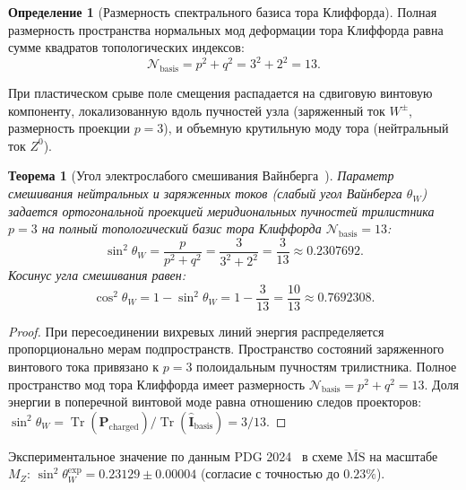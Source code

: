 \documentclass[11pt,a4paper]{article}
\newtheorem{theorem}{Теорема}
\theoremstyle{definition}
\newtheorem{definition}{Определение}
\theoremstyle{remark}
\begin{document}
\begin{definition}[Размерность спектрального базиса тора Клиффорда]
Полная размерность пространства нормальных мод деформации тора Клиффорда равна сумме квадратов топологических индексов:
\begin{equation}
\mathcal{N}_{\mathrm{basis}} = p^2 + q^2 = 3^2 + 2^2 = 13.
\label{eq:torus_basis_thirteen}
\end{equation}
\end{definition}
	
При пластическом срыве поле смещения распадается на сдвиговую винтовую компоненту, локализованную вдоль пучностей узла (заряженный ток $W^\pm$, размерность проекции $p=3$), и объемную крутильную моду тора (нейтральный ток $Z^0$).
	
\begin{theorem}[Угол электрослабого смешивания Вайнберга~\cite{Weinberg1967}]
\label{thm:weinberg_exact_derivation}
Параметр смешивания нейтральных и заряженных токов (слабый угол Вайнберга $\theta_W$) задается ортогональной проекцией меридиональных пучностей трилистника $p=3$ на полный топологический базис тора Клиффорда $\mathcal{N}_{\mathrm{basis}} = 13$:
\begin{equation}
	\sin^2\theta_W = \frac{p}{p^2 + q^2} = \frac{3}{3^2 + 2^2} = \frac{3}{13} \approx 0.2307692.
	\label{eq:weinberg_sin2_exact}
\end{equation}
Косинус угла смешивания равен:
\begin{equation}
	\cos^2\theta_W = 1 - \sin^2\theta_W = 1 - \frac{3}{13} = \frac{10}{13} \approx 0.7692308.
	\label{eq:weinberg_cos2_exact}
\end{equation}
\end{theorem}
	
\begin{proof}
При пересоединении вихревых линий энергия распределяется пропорционально мерам подпространств. Пространство состояний заряженного винтового тока привязано к $p=3$ полоидальным пучностям трилистника. Полное пространство мод тора Клиффорда имеет размерность $\mathcal{N}_{\mathrm{basis}} = p^2 + q^2 = 13$. Доля энергии в поперечной винтовой моде равна отношению следов проекторов: $\sin^2\theta_W = \operatorname{Tr}(\hat{\mathbf{P}}_{\mathrm{charged}}) / \operatorname{Tr}(\hat{\mathbf{I}}_{\mathrm{basis}}) = 3/13$.
\end{proof}
	
Экспериментальное значение по данным PDG 2024~\cite{PDG2024} в схеме $\overline{\mathrm{MS}}$ на масштабе $M_Z$: $\sin^2\theta_W^{\mathrm{exp}} = 0.23129 \pm 0.00004$ (согласие с точностью до $0.23\%$).
	
\end{document}
